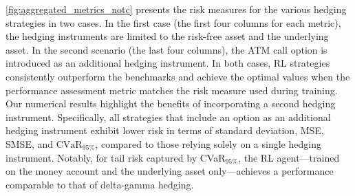 \documentclass[12pt]{article}
\begin{document}
\autoref{fig:aggregated_metrics_notc} presents the risk measures for the various hedging strategies in two cases. In the first case (the first four columns for each metric), the hedging instruments are limited to the risk-free asset and the underlying asset. In the second scenario (the last four columns), the ATM call option is introduced as an additional hedging instrument. In both cases, RL strategies consistently outperform the benchmarks and achieve the optimal values when the performance assessment metric matches the risk measure used during training.
Our numerical results highlight the benefits of incorporating a second hedging instrument. Specifically, all strategies that include an option as an additional hedging instrument exhibit lower risk in terms of standard deviation, MSE, SMSE, and $\text{CVaR}_{95\%}$, compared to those relying solely on a single hedging instrument. 
Notably, for tail risk captured by CVaR$_{95\%}$, the RL agent—trained on the money account and the underlying asset only—achieves a performance comparable to that of delta-gamma hedging.
\end{document}
